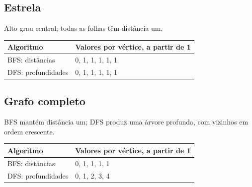\documentclass[a4paper,12pt]{article}
\begin{document}
\par\noindent\begin{minipage}{\textwidth}\subsection{Estrela}
Alto grau central; todas as folhas têm distância um.
\par\smallskip\noindent\begin{minipage}{\textwidth}\centering
\begingroup\small
\setlength{\tabcolsep}{4pt}
\begin{tabular}{l>{\raggedright\arraybackslash}p{10.4cm}}
\toprule
Algoritmo & Valores por vértice, a partir de 1 \\
\midrule
BFS: distâncias & \num{0}, \num{1}, \num{1}, \num{1}, \num{1}, \num{1} \\
DFS: profundidades & \num{0}, \num{1}, \num{1}, \num{1}, \num{1}, \num{1} \\
\bottomrule
\end{tabular}
\endgroup
\end{minipage}\par\smallskip
\end{minipage}\par\medskip
\par\noindent\begin{minipage}{\textwidth}\subsection{Grafo completo}
BFS mantém distância um; DFS produz uma árvore profunda, com vizinhos em ordem crescente.
\par\smallskip\noindent\begin{minipage}{\textwidth}\centering
\begingroup\small
\setlength{\tabcolsep}{4pt}
\begin{tabular}{l>{\raggedright\arraybackslash}p{10.4cm}}
\toprule
Algoritmo & Valores por vértice, a partir de 1 \\
\midrule
BFS: distâncias & \num{0}, \num{1}, \num{1}, \num{1}, \num{1} \\
DFS: profundidades & \num{0}, \num{1}, \num{2}, \num{3}, \num{4} \\
\bottomrule
\end{tabular}
\endgroup
\end{minipage}\par\smallskip
\end{minipage}\par\medskip
\end{document}
